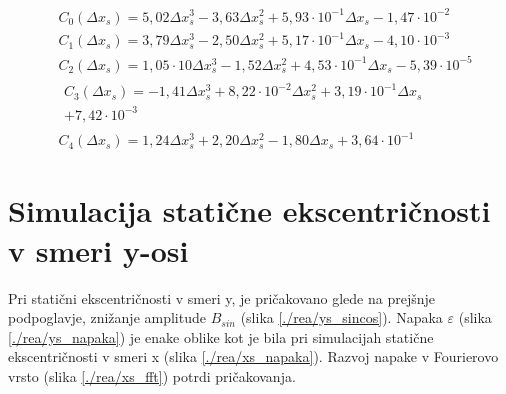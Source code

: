 \begin{eqnarray}
\label{real_xs_C0}
&C_0(\Delta x_s) =5,02\Delta x_s^{3}-3,63\Delta x_s^{2}+5,93\cdot 10^{-1}\Delta x_s-1,47\cdot 10^{-2} \\              
&C_1(\Delta x_s) =3,79\Delta x_s^{3}-2,50\Delta x_s^{2}+5,17\cdot 10^{-1}\Delta x_s-4,10\cdot 10^{-3} \\              
&C_2(\Delta x_s) =1,05\cdot 10\Delta x_s^{3}-1,52\Delta x_s^{2}+4,53\cdot 10^{-1}\Delta x_s-5,39\cdot 10^{-5} \\      
&\begin{split}C_3(\Delta x_s) =-1,41\Delta x_s^{3}+8,22\cdot 10^{-2}\Delta x_s^{2}+3,19\cdot 10^{-1}\Delta x_s\\+7,42\cdot 10^{-3} \end{split}\\
\label{real_xs_C4}
&C_4(\Delta x_s) =1,24\Delta x_s^{3}+2,20\Delta x_s^{2}-1,80\Delta x_s+3,64\cdot 10^{-1} 
\end{eqnarray}

\section{Simulacija statične ekscentričnosti v smeri y-osi}
Pri statični ekscentričnosti v smeri y, je pričakovano glede na prejšnje podpoglavje, znižanje amplitude $B_{sin}$ (slika \ref{./rea/ys_sincos}).  Napaka $\varepsilon$ (slika \ref{./rea/ys_napaka}) je enake oblike kot je bila pri simulacijah statične ekscentričnosti v smeri x (slika \ref{./rea/xs_napaka}). Razvoj napake v Fourierovo vrsto (slika \ref{./rea/xs_fft}) potrdi pričakovanja.
\newpage
